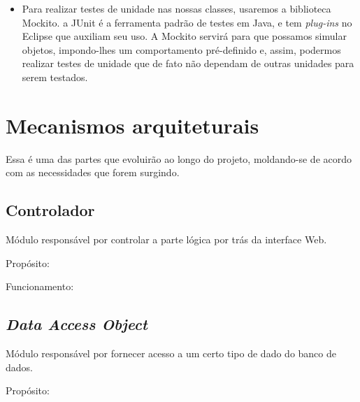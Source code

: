 \documentclass[11pt, a4paper]{article}
\begin{document}
\begin{itemize}
            \item Para realizar testes de unidade nas nossas classes, usaremos a
            biblioteca Mockito. a JUnit é a ferramenta padrão de testes em Java,
            e tem \textit{plug-ins} no Eclipse que auxiliam seu uso. A Mockito
            servirá para que possamos simular objetos, impondo-lhes um
            comportamento pré-definido e, assim, podermos realizar testes de
            unidade que de fato não dependam de outras unidades para serem
            testados.
        \end{itemize}
    
    \section{Mecanismos arquiteturais}
        Essa é uma das partes que evoluirão ao longo do projeto, moldando-se de
        acordo com as necessidades que forem surgindo.

        \subsection{Controlador}
            Módulo responsável por controlar a parte lógica por trás da
            interface Web.

            Propósito: %

            Funcionamento: %

        \subsection{\textit{Data Access Object}}
            Módulo responsável por fornecer acesso a um certo tipo de dado do
            banco de dados.

            Propósito: %
\end{document}
